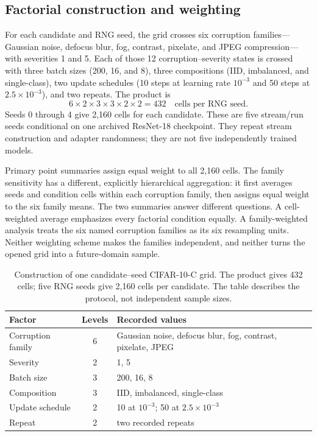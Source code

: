 \subsection{Factorial construction and weighting}
\label{fr:sec-cifar-grid}

For each candidate and RNG seed, the grid crosses six corruption families---Gaussian noise,
defocus blur, fog, contrast, pixelate, and JPEG compression---with severities 1 and 5.  Each of
those 12 corruption--severity states is crossed with three batch sizes (200, 16, and 8), three
compositions (IID, imbalanced, and single-class), two update schedules (10 steps at learning rate
$10^{-3}$ and 50 steps at $2.5\times10^{-3}$), and two repeats.  The product is
\begin{equation}
  6\times2\times3\times3\times2\times2=432
  \quad\text{cells per RNG seed}.
\label{fr:eq-cifar-grid-size}
\end{equation}
Seeds 0 through 4 give 2,160 cells for each candidate.  These are five stream/run seeds conditional
on one archived ResNet-18 checkpoint.  They repeat stream construction and adapter randomness;
they are not five independently trained models.

Primary point summaries assign equal weight to all 2,160 cells.  The family sensitivity has a
different, explicitly hierarchical aggregation: it first averages seeds and condition cells within
each corruption family, then assigns equal weight to the six family means.  The two summaries
answer different questions.  A cell-weighted average emphasizes every factorial condition equally.
A family-weighted analysis treats the six named corruption families as its six resampling units.
Neither weighting scheme makes the families independent, and neither turns the opened grid into a
future-domain sample.

\begin{table}[t]
\centering
\small
\caption{Construction of one candidate--seed CIFAR-10-C grid.  The product gives 432 cells; five
RNG seeds give 2,160 cells per candidate.  The table describes the protocol, not independent sample
sizes.}
\label{fr:tab-cifar-grid}
\begin{tabular}{@{}lcl@{}}
\toprule
Factor & Levels & Recorded values \\
\midrule
Corruption family & 6 & Gaussian noise, defocus blur, fog, contrast, pixelate, JPEG \\
Severity & 2 & 1, 5 \\
Batch size & 3 & 200, 16, 8 \\
Composition & 3 & IID, imbalanced, single-class \\
Update schedule & 2 & 10 at $10^{-3}$; 50 at $2.5\times10^{-3}$ \\
Repeat & 2 & two recorded repeats \\
\bottomrule
\end{tabular}
\end{table}

